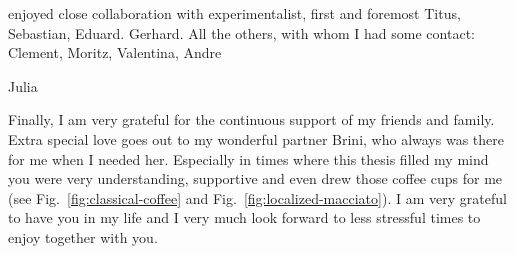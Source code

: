 enjoyed close collaboration with experimentalist, first and foremost Titus, Sebastian, Eduard. Gerhard. All the others, with whom I had some contact: Clement, Moritz, Valentina, Andre

Julia


Finally, I am very grateful for the continuous support of my friends and family. Extra special love goes out to my wonderful partner Brini, who always was there for me when I needed her. Especially in times where this thesis filled my mind you were very understanding, supportive and even drew those coffee cups for me (see Fig.~\ref{fig:classical-coffee} and Fig.~\ref{fig:localized-macciato}).
I am very grateful to have you in my life and I very much look forward to less stressful times to enjoy together with you.
\endgroup
